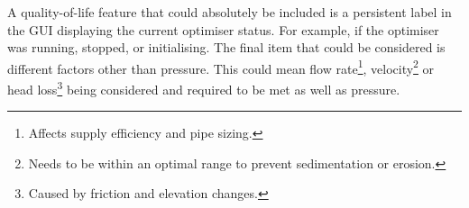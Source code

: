 A quality-of-life feature that could absolutely be included is a persistent label in the GUI displaying the current optimiser status. For example, if the optimiser was running, stopped, or initialising.\newline
The final item that could be considered is different factors other than pressure. This could mean flow rate\footnote{Affects supply efficiency and pipe sizing.}, velocity\footnote{Needs to be within an optimal range to prevent sedimentation or erosion.} or head loss\footnote{Caused by friction and elevation changes.} being considered and required to be met as well as pressure.